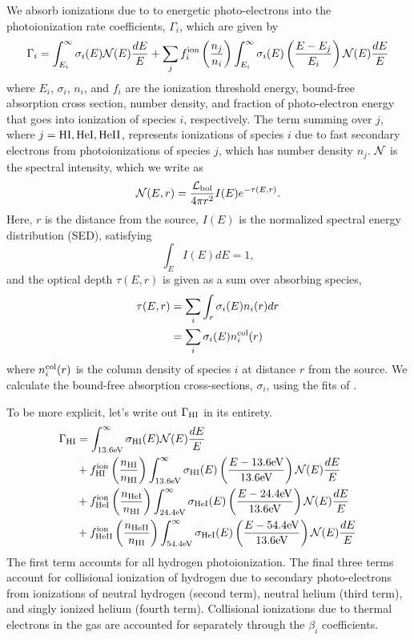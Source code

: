 \documentclass[letterpaper,titlepage,12pt]{article}
\numberwithin{equation}{section}
\begin{document}
We absorb ionizations due to to energetic photo-electrons into the
photoionization rate coefficients, $\Gamma_i$, which are given by
\begin{equation}
    \Gamma_i = \int_{E_i}^{\infty} \sigma_i(E) \mathcal{N}(E) \frac{dE}{E} + \sum_j f_i^{\text{ion}} \left(\frac{n_j}{n_i}\right) \int_{E_i}^{\infty} \sigma_i(E)\left(\frac{E - E_j}{E_i}\right) \mathcal{N}(E) \frac{dE}{E} \label{eq:PhotoionizationRate}
\end{equation}
where $E_i$, $\sigma_i$, $n_i$, and $f_i$ are the ionization threshold energy,
bound-free absorption cross section, number density, and fraction of
photo-electron energy that goes into ionization of species $i$, respectively.
The term summing over $j$, where $j = \text{HI}, \text{HeI}, \text{HeII}$, represents
ionizations of species $i$ due to fast secondary electrons from
photoionizations of species $j$, which has number density $n_j$. $\mathcal{N}$ is
the spectral intensity, which we write as
\begin{equation}
    \mathcal{N}(E, r) = \frac{\mathcal{L}_{\text{bol}}}{4\pi r^2} I(E) e^{-\tau(E, r)} . \label{eq:Spectrum}
\end{equation}
Here, $r$ is the distance from the source, $I(E)$ is the normalized spectral
energy distribution (SED), satisfying
\begin{equation}
    \int_E I(E) dE = 1 ,
\end{equation}
and the optical depth $\tau(E, r)$ is given as a sum over absorbing species,
\begin{align}
    \tau(E, r) & = \sum_i \int_r \sigma_i(E) n_i(r) dr \nonumber \\
               & = \sum_i \sigma_i(E) n_i^{\text{col}}(r) \label{eq:OpticalDepth}
\end{align}
where $n_i^{\text{col}}(r)$ is the column density of species $i$ at distance $r$ from the
source. We calculate the bound-free absorption cross-sections, $\sigma_i$,
using the fits of \cite{Verner1996}. 

To be more explicit, let's write out $\Gamma_{\text{HI}}$ in its entirety.
\begin{align}
    \Gamma_{\text{HI}} & = \int_{13.6\mathrm{eV}}^{\infty}\sigma_{\text{HI}}(E) \mathcal{N}(E) \frac{dE}{E} \nonumber \\
    & + f_{\text{HI}}^{\mathrm{ion}} \left(\frac{n_{\text{HI}}}{n_{\text{HI}}}\right) \int_{13.6\mathrm{eV}}^{\infty}\sigma_{\text{HI}}(E) \left(\frac{E - 13.6\mathrm{eV}}{13.6\mathrm{eV}}\right)\mathcal{N}(E)\frac{dE}{E} \nonumber \\
    & + f_{\text{HeI}}^{\mathrm{ion}} \left(\frac{n_{\text{HeI}}}{n_{\text{HI}}}\right) \int_{24.4\mathrm{eV}}^{\infty}\sigma_{\text{HeI}}(E) \left(\frac{E - 24.4\mathrm{eV}}{13.6\mathrm{eV}}\right)\mathcal{N}(E)\frac{dE}{E} \nonumber \\
    & + f_{\text{HeII}}^{\mathrm{ion}} \left(\frac{n_{\text{HeII}}}{n_{\text{HI}}}\right) \int_{54.4\mathrm{eV}}^{\infty}\sigma_{\text{HeI}}(E) \left(\frac{E - 54.4\mathrm{eV}}{13.6\mathrm{eV}}\right)\mathcal{N}(E)\frac{dE}{E}
\end{align}    
The first term accounts for all hydrogen photoionization.  The final three terms account for collisional ionization of hydrogen due to secondary photo-electrons from ionizations of neutral hydrogen (second term), neutral helium (third term), and singly ionized helium (fourth term).  Collisional ionizations due to thermal electrons in the gas are accounted for separately through the $\beta_i$ coefficients.
\end{document}
